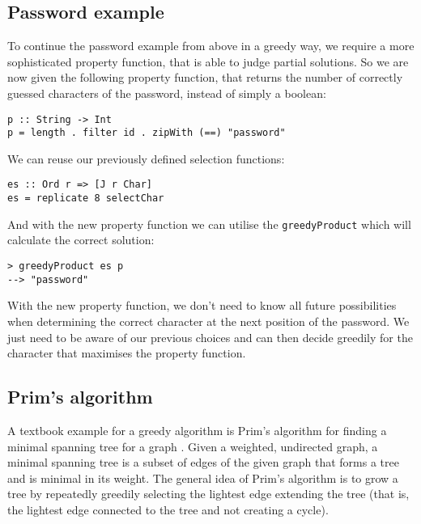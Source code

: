 \documentclass[runningheads]{llncs}
\begin{document}
\subsection{Password example}
To continue the password example from above in a greedy way, we require a more sophisticated property function, that is able to judge partial solutions. So we are now given the following property function, that returns the number of correctly guessed characters of the password, instead of simply a boolean:
\begin{verbatim}
p :: String -> Int
p = length . filter id . zipWith (==) "password"
\end{verbatim}
We can reuse our previously defined selection functions:
\begin{verbatim}
es :: Ord r => [J r Char]
es = replicate 8 selectChar
\end{verbatim}
And with the new property function we can utilise the \texttt{greedyProduct} which will calculate the correct solution:
\begin{verbatim}
> greedyProduct es p
--> "password"
\end{verbatim}
With the new property function, we don't need to know all future possibilities when determining the correct character at the next position of the password. We just need to be aware of our previous choices and can then decide greedily for the character that maximises the property function.
%
%
%
\subsection{Prim's algorithm}
A textbook example for a greedy algorithm is Prim's algorithm for finding a minimal spanning tree for a graph \cite{prim1957shortest}. Given a weighted, undirected graph, a minimal spanning tree is a subset of edges of the given graph that forms a tree and is minimal in its weight. The general idea of Prim's algorithm is to grow a tree by repeatedly greedily selecting the lightest edge extending the tree (that is, the lightest edge connected to the tree and not creating a cycle).
\end{document}
